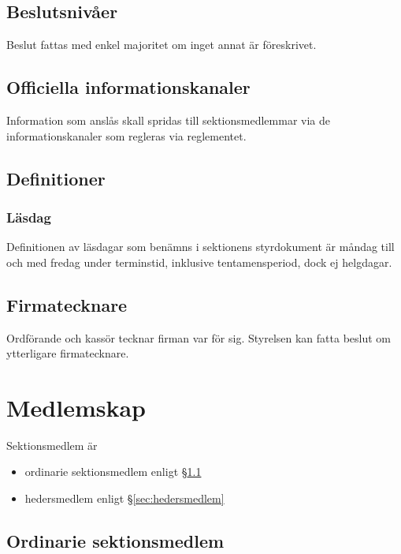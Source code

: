 \documentclass{../resources/dgovdoc}
\begin{document}
\subsection{Beslutsnivåer}

Beslut fattas med enkel majoritet om inget annat är föreskrivet.

\subsection{Officiella informationskanaler}
\label{sec:officiella_informationskanaler}

Information som anslås skall spridas till sektionsmedlemmar via de informationskanaler som regleras via reglementet.

\subsection{Definitioner}

\subsubsection{Läsdag}

Definitionen av läsdagar som benämns i sektionens styrdokument är
måndag till och med fredag under terminstid, inklusive tentamensperiod, dock ej helgdagar.

\subsection{Firmatecknare}

Ordförande och kassör tecknar firman var för sig. Styrelsen kan fatta beslut
om ytterligare firmatecknare. 

\section{Medlemskap}

Sektionsmedlem är

\begin{itemize}
  \item ordinarie sektionsmedlem enligt \S\ref{sec:ordinarie_sektionsmedlem}
  \item hedersmedlem enligt \S\ref{sec:hedersmedlem}
\end{itemize}

\subsection{Ordinarie sektionsmedlem}
\label{sec:ordinarie_sektionsmedlem}
\end{document}
